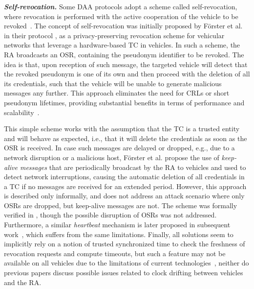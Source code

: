 \iffalse
Besides, pre-issuing certificates that are activated later in time requires
stronger assumptions in terms of how certificates are managed by a vehicle. For
example, IFAL relies on a fully trusted \ac{OBU} with access to a trusted time
source to enforce constraints on the usage of certificates, e.g., that each
certificate is only used for a pre-defined amount of time (e.g., 5 minutes),
then rotated and never used again.
\fi 

\noindent\textbf{\emph{Self-revocation.}}
%
Some \ac{DAA} protocols adopt a scheme called self-revocation, where revocation
is performed with the active cooperation of the vehicle to be
revoked~\cite{whitefield2017privacy,desmoulins2019practical,larsen2021daa}. The
concept of self-revocation was initially proposed by F\"orster et al. in their
\rewire{} protocol \cite{forster2015rewire}, as a privacy-preserving revocation
scheme for vehicular networks that leverage a hardware-based \ac{TC} in
vehicles.
In such a scheme, the \ac{RA} broadcasts an \ac{OSR}, containing the pseudonym
identifier to be revoked. The idea is that, upon reception of such message, the
targeted vehicle will detect that the revoked pseudonym is one of its own and
then proceed with the deletion of all its credentials, such that the vehicle
will be unable to generate malicious messages any further. This approach
eliminates the need for \acp{CRL} or short pseudonym lifetimes, providing
substantial benefits in terms of performance and
scalability~\cite{angelogianni2023comparative}.

This simple scheme works with the assumption that the \ac{TC} is a trusted
entity and will behave as expected, i.e., that it will delete the credentials as
soon as the \ac{OSR} is received. In case such messages are delayed or dropped,
e.g., due to a network disruption or a malicious host, F\"orster et al.  propose
the use of \emph{keep-alive messages} that are periodically broadcast by the
\ac{RA} to vehicles and used to detect network interruptions, causing the
automatic deletion of all credentials in a \ac{TC} if no messages are received
for an extended period. However, this approach is described only informally, and
does not address an attack scenario where only \acp{OSR} are dropped, but
keep-alive messages are not. The \rewire{} scheme was formally verified in
\cite{whitefield2017formal}, though the possible disruption of \acp{OSR} was not
addressed. Furthermore, a similar \emph{heartbeat} mechanism is later proposed
in subsequent
work~\cite{whitefield2017privacy,desmoulins2019practical,larsen2021daa}, which
suffers from the same limitations. Finally, all solutions seem to implicitly
rely on a notion of trusted synchronized time to check the freshness of
revocation requests and compute timeouts, but such a feature may not be
available on all vehicles due to the limitations of current
technologies~\cite{alder2023about,anwar2019applications}, neither do previous
papers discuss possible issues related to clock drifting between vehicles and
the \ac{RA}.



